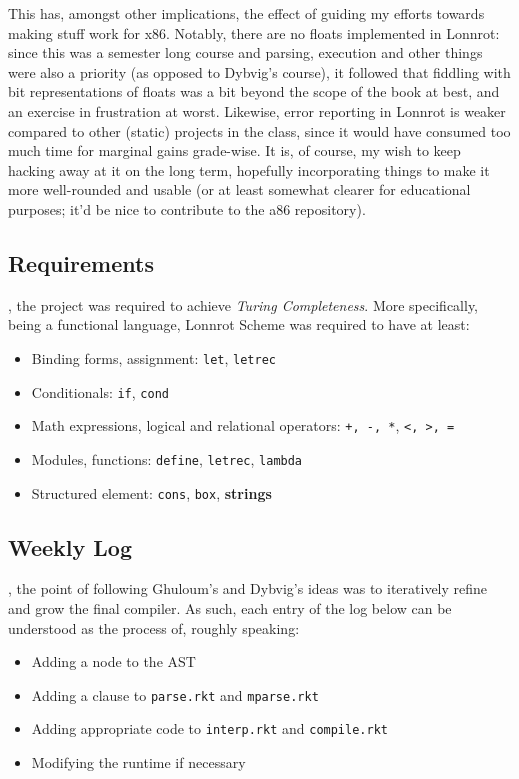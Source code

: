 This has, amongst other implications, the effect of guiding my efforts towards making stuff work
for x86. Notably, there are no floats implemented in Lonnrot: since this was a semester long course
and parsing, execution and other things were also a priority (as opposed to Dybvig's course), it
followed that fiddling with bit representations of floats was a bit beyond the scope of the book
at best, and an exercise in frustration at worst. Likewise, error reporting in Lonnrot is weaker
compared to other (static) projects in the class, since it would have consumed too much time for
marginal gains grade-wise. It is, of course, my wish to keep hacking away at it on the long term,
hopefully incorporating things to make it more well-rounded and usable (or at least somewhat clearer
for educational purposes; it'd be nice to contribute to the a86 repository).

\subsection*{Requirements}\label{app:reqs}
, the project was required to achieve \textit{Turing Completeness}. More
specifically, being a functional language, Lonnrot Scheme was required to have at least:

\begin{itemize}
  \item Binding forms, assignment: \texttt{let}, \texttt{letrec}
  \item Conditionals: \texttt{if}, \texttt{cond}
  \item Math expressions, logical and relational operators: \texttt{+, -, *}, \texttt{<, >, =}
  \item Modules, functions: \texttt{define}, \texttt{letrec}, \texttt{lambda}
  \item Structured element: \texttt{cons}, \texttt{box}, \textbf{strings}
\end{itemize}

\subsection*{Weekly Log}
, the point of following Ghuloum's and Dybvig's ideas was to
iteratively refine and grow the final compiler. As such, each entry of the log below can be understood as the
process of, roughly speaking:

\begin{itemize}
  \item Adding a node to the AST
  \item Adding a clause to \texttt{parse.rkt} and \texttt{mparse.rkt}
  \item Adding appropriate code to \texttt{interp.rkt} and \texttt{compile.rkt}
  \item Modifying the runtime if necessary
\end{itemize}

